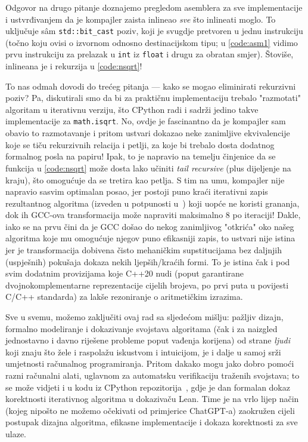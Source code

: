 \documentclass[12pt]{scrartcl}
\begin{document}
Odgovor na drugo pitanje doznajemo pregledom asemblera za sve implementacije i ustvrđivanjem da je kompajler zaista inlineao \emph{sve} što 
inlineati moglo. To uključuje s\^am \verb|std::bit_cast| poziv, koji je svugdje pretvoren u jednu instrukciju (točno koju ovisi o izvornom odnosno
destinacijskom tipu; u \autoref{code:asm1} vidimo prvu instrukciju za prelazak u \verb|int| iz \verb|float| i drugu za obratan smjer). Štoviše,
inlineana je i rekurzija u \autoref{code:nsqrt}!

To nas odmah dovodi do trećeg pitanja --- kako se mogao eliminirati rekurzivni poziv? Pa, diskutirali smo da bi za praktičnu implementaciju trebalo
"razmotati" algoritam u iterativnu verziju, što CPython radi i sadrži jedino takve implementacije za \verb|math.isqrt|. No, ovdje je fascinantno da je
kompajler sam obavio to razmotavanje i pritom ustvari dokazao neke zanimljive ekvivalencije koje se tiču rekurzivnih relacija i petlji, za koje bi
trebalo dosta dodatnog formalnog posla na papiru! Ipak, to je napravio na temelju
činjenice da se funkcija u \autoref{code:nsqrt} može dosta lako učiniti \textsl{tail recursive} (plus dijeljenje na kraju),
što omogućuje da se tretira kao petlja.
S tim na umu, kompajler nije napravio sasvim optimalan posao, jer postoji puno kraći iterativni zapis rezultantnog algoritma
(izveden u potpunosti u~\cite{mdickpaper}) koji uopće ne koristi grananja,
dok ih GCC-ova transformacija može napraviti maksimalno $8$ po iteraciji! Dakle, iako se na prvu čini da je GCC došao
do nekog zanimljivog "otkrića" oko našeg
algoritma koje mu omogućuje njegov puno efikasniji zapis, to ustvari nije istina jer je transformacija dobivena čisto mehaničkim supstitucijama bez daljnjih
(uspješnih) pokušaja dokaza nekih ljepših/kraćih formi. To je istina čak i pod svim dodatnim provizijama koje C++20 nudi (poput garantirane dvojnokomplementarne
reprezentacije cijelih brojeva, po prvi puta u povijesti C/C++ standarda) za lakše rezoniranje o aritmetičkim izrazima.

Sve u svemu, možemo zaključiti ovaj rad sa sljedećom mišlju: pažljiv dizajn, formalno modeliranje i dokazivanje svojstava algoritama
(čak i za naizgled jednostavno i davno riješene probleme poput vađenja korijena)
od strane \emph{ljudi} koji znaju što žele i raspolažu iskustvom i intuicijom, je i dalje u samoj srži umjetnosti računalnog programiranja. Pritom
dakako mogu jako dobro pomoći razni računalni alati, uglavnom za automatsku verifikaciju traženih svojstava; to se
može vidjeti i u kodu iz CPython repozitorija~\cite{Cpythonisqrt}, gdje je dan formalan dokaz korektnosti iterativnog algoritma u dokazivaču Lean.
Time je na vrlo lijep način (kojeg nipošto ne možemo očekivati od primjerice ChatGPT-a)
zaokružen cijeli postupak dizajna algoritma, efikasne implementacije i dokaza korektnosti za sve ulaze.
\pagebreak


\printbibliography
\end{document}
